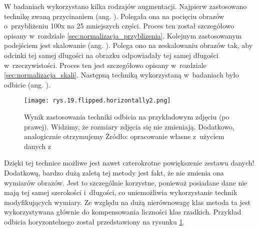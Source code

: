W badaniach wykorzystano kilka rodzajów augmentacji. Najpierw zastosowano technikę zwaną przycinaniem (ang. ). Polegała ona na pocięciu obrazów o~przybliżeniu 100x na 25 mniejszych części. Proces ten został szczegółowo opisany w~rozdziale \ref{sec:normalizacja_przyblizenia}. Kolejnym zastosowanym podejściem jest skalowanie (ang. ).  Polega ono na zeskalowaniu obrazów tak, aby odcinki tej samej długości na obrazku odpowiadały tej samej długości w~rzeczywistości. Proces ten jest szczegółowo opisany w~rozdziale \ref{sec:normalizacja_skali}. Następną techniką wykorzystaną w~badaniach było odbicie (ang. ).
\begin{figure}[h]
    \centering
    \texttt{[image: rys.19.flipped.horizontally2.png]}
    \caption{Wynik zastosowania techniki odbicia na przykładowym zdjęciu (po prawej). Widzimy, że rozmiary zdjęcia się nie zmieniają. Dodatkowo, analogicznie otrzymujemy Żródło: opracowanie własne z~użyciem danych z~\cite{Pirowski17}}
    \label{fig:mesh19}
\end{figure}
Dzięki tej technice możliwe jest nawet czterokrotne powiększenie zestawu danych! Dodatkową, bardzo dużą zaletą tej metody jest fakt, że nie zmienia ona wymiarów obrazów. Jest to szczególnie korzystne, ponieważ posiadane  dane nie mają tej samej szerokości i~długości, co uniemożliwia wykorzystanie technik modyfikujących wymiary. Ze względu na dużą nierównowagę klas metoda ta jest wykorzystywana głównie do kompensowania liczności klas rzadkich. Przykład odbicia horyzontelnego został przedstawiony na rysunku \ref{fig:mesh19}.
















